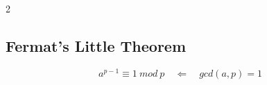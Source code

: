 \documentclass[8pt, letterpaper]{article}
\begin{document}
\begin{multicols}{2}
\subsection{Fermat's Little Theorem}
$$
a^{p-1} \equiv 1 ~ mod ~p \quad \Longleftarrow \quad gcd(a, p)=1
$$
\end{multicols}
\end{document}
